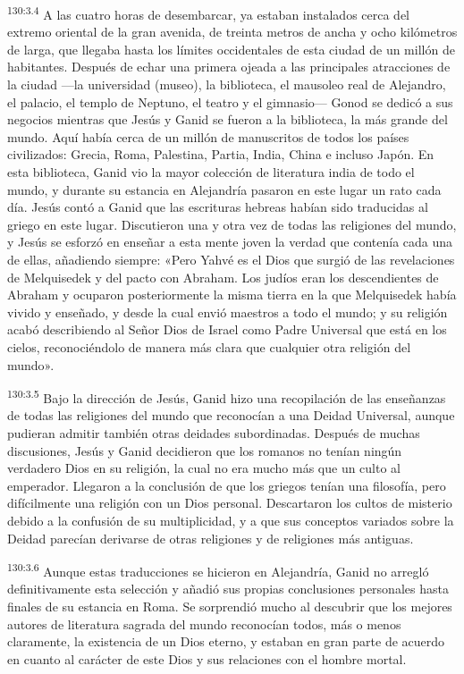 \par
\textsuperscript{130:3.4} A las cuatro horas de desembarcar, ya estaban instalados cerca del extremo oriental de la gran avenida, de treinta metros de ancha y ocho kilómetros de larga, que llegaba hasta los límites occidentales de esta ciudad de un millón de habitantes. Después de echar una primera ojeada a las principales atracciones de la ciudad ---la universidad (museo), la biblioteca, el mausoleo real de Alejandro, el palacio, el templo de Neptuno, el teatro y el gimnasio--- Gonod se dedicó a sus negocios mientras que Jesús y Ganid se fueron a la biblioteca, la más grande del mundo. Aquí había cerca de un millón de manuscritos de todos los países civilizados: Grecia, Roma, Palestina, Partia, India, China e incluso Japón. En esta biblioteca, Ganid vio la mayor colección de literatura india de todo el mundo, y durante su estancia en Alejandría pasaron en este lugar un rato cada día. Jesús contó a Ganid que las escrituras hebreas habían sido traducidas al griego en este lugar. Discutieron una y otra vez de todas las religiones del mundo, y Jesús se esforzó en enseñar a esta mente joven la verdad que contenía cada una de ellas, añadiendo siempre: «Pero Yahvé es el Dios que surgió de las revelaciones de Melquisedek y del pacto con Abraham. Los judíos eran los descendientes de Abraham y ocuparon posteriormente la misma tierra en la que Melquisedek había vivido y enseñado, y desde la cual envió maestros a todo el mundo; y su religión acabó describiendo al Señor Dios de Israel como Padre Universal que está en los cielos, reconociéndolo de manera más clara que cualquier otra religión del mundo».

\par
\textsuperscript{130:3.5} Bajo la dirección de Jesús, Ganid hizo una recopilación de las enseñanzas de todas las religiones del mundo que reconocían a una Deidad Universal, aunque pudieran admitir también otras deidades subordinadas. Después de muchas discusiones, Jesús y Ganid decidieron que los romanos no tenían ningún verdadero Dios en su religión, la cual no era mucho más que un culto al emperador. Llegaron a la conclusión de que los griegos tenían una filosofía, pero difícilmente una religión con un Dios personal. Descartaron los cultos de misterio debido a la confusión de su multiplicidad, y a que sus conceptos variados sobre la Deidad parecían derivarse de otras religiones y de religiones más antiguas.

\par
\textsuperscript{130:3.6} Aunque estas traducciones se hicieron en Alejandría, Ganid no arregló definitivamente esta selección y añadió sus propias conclusiones personales hasta finales de su estancia en Roma. Se sorprendió mucho al descubrir que los mejores autores de literatura sagrada del mundo reconocían todos, más o menos claramente, la existencia de un Dios eterno, y estaban en gran parte de acuerdo en cuanto al carácter de este Dios y sus relaciones con el hombre mortal.

